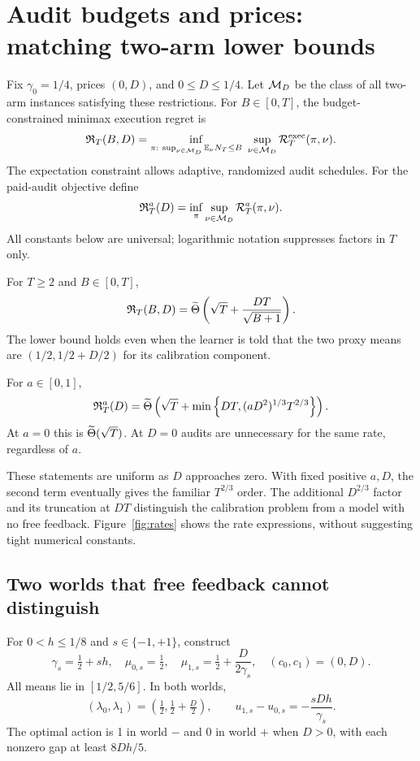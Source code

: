 \section{Audit budgets and prices: matching two-arm lower bounds}
Fix $\gamma_0=1/4$, prices $(0,D)$, and $0\leq D\leq1/4$. Let $\mathcal{M}_D$ be the class of all two-arm instances satisfying these restrictions. For $B\in[0,T]$, the budget-constrained minimax execution regret is
\begin{equation}
\mathfrak R_T(B,D)=
\inf_{\pi:\ \sup_{\nu\in\mathcal{M}_D}\mathbb{E}_\nu N_T\leq B}
\ \sup_{\nu\in\mathcal{M}_D}\mathcal{R}_T^{\rm exec}(\pi,\nu).
\label{eq:budgetdef}
\end{equation}
The expectation constraint allows adaptive, randomized audit schedules. For the paid-audit objective define
\[\mathfrak R_T^a(D)=\inf_\pi\sup_{\nu\in\mathcal{M}_D}\mathcal{R}_T^a(\pi,\nu).\] All constants below are universal; logarithmic notation suppresses factors in $T$ only.

\begin{theorem}\label{thm:budget}
For $T\geq2$ and $B\in[0,T]$,
\begin{equation}
\mathfrak R_T(B,D)=\widetilde\Theta\left(\sqrt T+\frac{DT}{\sqrt{B+1}}\right).
\label{eq:budgetrate}
\end{equation}
The lower bound holds even when the learner is told that the two proxy means are $(1/2,1/2+D/2)$ for its calibration component.
\end{theorem}
\begin{theorem}\label{thm:price}
For $a\in[0,1]$,
\begin{equation}
\mathfrak R_T^a(D)=\widetilde\Theta\left(
\sqrt T+\min\left\{DT,(aD^2)^{1/3}T^{2/3}\right\}\right).
\label{eq:pricerate}
\end{equation}
At $a=0$ this is $\widetilde\Theta(\sqrt T)$. At $D=0$ audits are unnecessary for the same rate, regardless of $a$.
\end{theorem}
These statements are uniform as $D$ approaches zero. With fixed positive $a,D$, the second term eventually gives the familiar $T^{2/3}$ order. The additional $D^{2/3}$ factor and its truncation at $DT$ distinguish the calibration problem from a model with no free feedback. Figure~\ref{fig:rates} shows the rate expressions, without suggesting tight numerical constants.

\subsection{Two worlds that free feedback cannot distinguish}
For $0<h\leq1/8$ and $s\in\{-1,+1\}$, construct
\begin{equation}
\gamma_s=\tfrac12+sh,\quad
\mu_{0,s}=\tfrac12,\quad
\mu_{1,s}=\tfrac12+\frac{D}{2\gamma_s},\quad
(c_0,c_1)=(0,D).
\label{eq:hardpair}
\end{equation}
All means lie in $[1/2,5/6]$. In both worlds,
\begin{equation}
(\lambda_0,\lambda_1)=(\tfrac12,\tfrac12+\tfrac D2),\qquad
u_{1,s}-u_{0,s}=-\frac{sDh}{\gamma_s}.
\label{eq:hardgap}
\end{equation}
The optimal action is 1 in world $-$ and 0 in world $+$ when $D>0$, with each nonzero gap at least $8Dh/5$.

